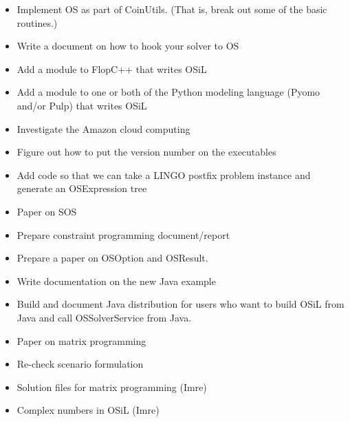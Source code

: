 
\ifbible

\label{section:wishlist} 

\begin{itemize}

\item Implement OS as part of CoinUtils. (That is, break out some of the basic routines.)

\item Write a document on how to hook your solver to OS

\item Add a module to FlopC++ that writes OSiL

\item Add a module to one or both of the Python modeling language (Pyomo and/or Pulp) that writes OSiL

\item Investigate the Amazon cloud computing

\item Figure out how to put the version number on the executables

\item Add code so that we can take a LINGO postfix problem instance and generate an OSExpression tree

\item Paper on SOS

\item Prepare constraint programming document/report

\item Prepare a paper on OSOption and OSResult.

\item Write documentation on the new Java example 

\item Build and document Java distribution for users who want to build OSiL from Java and 
call OSSolverService from Java. 

\item Paper on matrix programming

\item Re-check scenario formulation

\item Solution files for matrix programming (Imre)

\item Complex numbers in OSiL (Imre)


\end{itemize}

